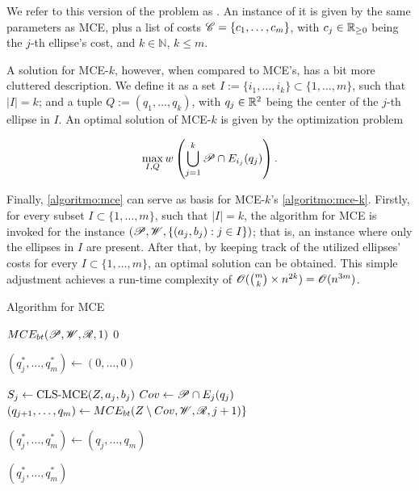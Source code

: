 We refer to this version of the problem as  . An instance of it is given by the same parameters as MCE, plus a list of costs $\mathscr{C}=\{c_1, \dots, c_m\}$, with $c_j\in\mathbb{R}_{\ge0}$ being the $j$-th ellipse's cost, and $k\in\mathbb{N}$, $k\le m$.

 A solution for MCE-$k$, however,  when compared to MCE's, has a bit more cluttered description. We define it as a set $I:=\{i_1, \dots, i_k\}\subset\{1, \dots, m\}$, such that $|I|=k$; and a tuple $Q:=(q_1, \dots, q_k)$, with $q_j\in\mathbb{R}^2$ being the center of the $j$-th ellipse in $I$. An optimal solution of MCE-$k$ is given by the optimization problem

\begin{equation*}
\max_{I, Q} w\left(\bigcup_{j=1}^k \mathscr{P} \cap E_{i_j}(q_j)\right).
\end{equation*}

Finally, \autoref{algoritmo:mce} can serve as basis for MCE-$k$'s \autoref{algoritmo:mce-k}. 
Firstly, for every subset $I \subset \{1, \dots, m\}$, such that $|I| = k$, the algorithm for MCE is invoked for the instance $(\mathscr{P}, \mathscr{W}, \{(a_j, b_j) : j \in I\})$; that is, an instance where only the ellipses in $I$ are present.
After that, by keeping track of the utilized ellipses' costs for every $I \subset \{1, \dots, m\}$, an optimal solution can be obtained.
This simple adjustment achieves a run-time complexity of $\mathscr{O}(\binom{m}{k} \times n^{2k}) = \mathscr{O}(n^{3m})$. 

\begin{algoritmo}
    \caption{Algorithm for MCE}\label{algoritmo:mce}
    
    \begin{algorithmic}[1]
        
        
        \item[]
	    \State \Return $MCE_{bt}(\mathscr{P}, \mathscr{W}, \mathscr{R}, 1)$
        \EndProcedure
        \State
        \State \Return $0$
        \EndIf
        
        \State $(q_j^*, \dots, q_m^*) \gets (0, \dots, 0)$

        \State $S_j \gets \textnormal{CLS-MCE}(Z, a_j, b_j)$
        \State $Cov \gets \mathscr{P} \cap E_j(q_j)$
        \State $(q_{j+1}, \dots, q_m) \gets MCE_{bt}(Z \setminus Cov, \mathscr{W}, \mathscr{R}, j+1)\}$
        
        \State $(q_j^*, \dots, q_m^*) \gets(q_j, \dots, q_m)$
        \EndIf
        \EndFor

        \State \Return $(q_j^*, \dots, q_m^*)$
        \EndProcedure
    \end{algorithmic}
\end{algoritmo}

